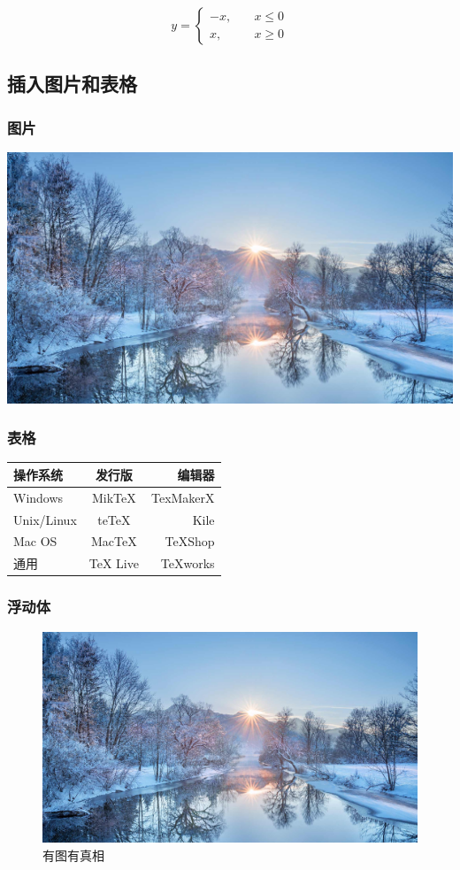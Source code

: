 \documentclass[UTF8]{ctexart}
\begin{document}
\[ y= \begin{cases}

-x,\quad & x\leq 0 \\
x,\quad & x\geq 0

\end{cases} \]

\subsection{ 插入图片和表格}
\subsubsection{图片}

\includegraphics[width = .9\textwidth]{a.jpg}

\subsubsection{表格}

\begin{tabular}{|l|c|r|}
 \hline
操作系统& 发行版& 编辑器\\
 \hline
Windows & MikTeX & TexMakerX \\
 \hline
Unix/Linux & teTeX & Kile \\
 \hline
Mac OS & MacTeX & TeXShop \\
 \hline
通用& TeX Live & TeXworks \\
 \hline
\end{tabular}

\subsubsection{浮动体}

\begin{figure}[htbp]
\centering
\includegraphics[width = .9\textwidth]{a.jpg}
\caption{有图有真相}
\label{fig:myphoto}
\end{figure}
\end{document}
